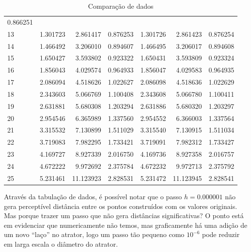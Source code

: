 \documentclass[12pt, a4paper]{article}
\begin{document}
\begin{table}[h!]
\begin{tabular}{|l|r|r|r|r|r|r|}
            0.866251
            \\
            13 & 1.301723 & 2.861417  & 0.876253 & 1.301726     & 2.861423     &
            0.876254
            \\
            14 & 1.466492 & 3.206010  & 0.894607 & 1.466495     & 3.206017     &
            0.894608
            \\
            15 & 1.650427 & 3.593802  & 0.923322 & 1.650431     & 3.593809     &
            0.923324
            \\
            16 & 1.856043 & 4.029574  & 0.964933 & 1.856047     & 4.029583     &
            0.964935
            \\
            17 & 2.086094 & 4.518626  & 1.022627 & 2.086098     & 4.518636     &
            1.022629
            \\
            18 & 2.343603 & 5.066769  & 1.100408 & 2.343608     & 5.066780     &
            1.100411
            \\
            19 & 2.631881 & 5.680308  & 1.203294 & 2.631886     & 5.680320     &
            1.203297
            \\
            20 & 2.954546 & 6.365989  & 1.337560 & 2.954552     & 6.366003     &
            1.337564
            \\
            21 & 3.315532 & 7.130899  & 1.511029 & 3.315540     & 7.130915     &
            1.511034
            \\
            22 & 3.719083 & 7.982295  & 1.733421 & 3.719091     & 7.982312     &
            1.733427
            \\
            23 & 4.169727 & 8.927339  & 2.016750 & 4.169736     & 8.927358     &
            2.016757
            \\
            24 & 4.672222 & 9.972692  & 2.375784 & 4.672232     & 9.972713     &
            2.375792
            \\
            25 & 5.231461 & 11.123923 & 2.828531 & 5.231472     & 11.123945    &
            2.828541
            \\
            \hline
        \end{tabular}
        \caption{Comparação de dados}
        \label{tab:comparacao-original-var}
    \end{table}
    
    Através da tabulação de dados, é possível notar que o passo $h = 0.000001$
    não gera perceptível distância entre os pontos construídos com os valores
    originais.  Mas porque trazer um passo que não gera distâncias significativas?
    O ponto está em evidenciar que numericamente não temos, mas graficamente há uma
    adição de um novo ``laço'' no atrator, logo um passo tão pequeno como $10^{-6}$
    pode reduzir em larga escala o diâmetro do atrator.
    
\end{document}
